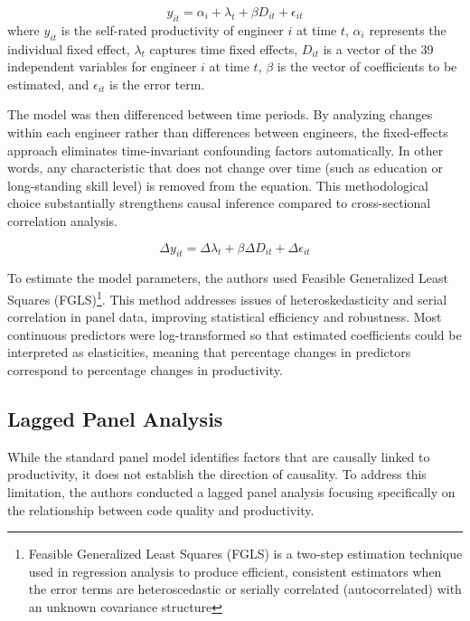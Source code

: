 \begin{equation}
    y_{it} = \alpha_{i} + \lambda_t + \beta D_{it} + \epsilon_{it}
\end{equation}
where $y_{it}$ is the self-rated productivity of engineer $i$ at time $t$, $\alpha_{i}$ represents the individual fixed effect, $\lambda_t$ captures time fixed effects, $D_{it}$ is a vector of the 39 independent variables for engineer $i$ at time $t$, $\beta$ is the vector of coefficients to be estimated, and $\epsilon_{it}$ is the error term.

The model was then differenced between time periods. By analyzing changes within each engineer rather than differences between engineers, the fixed-effects approach eliminates time-invariant confounding factors automatically. In other words, any characteristic that does not change over time (such as education or long-standing skill level) is removed from the equation. This methodological choice substantially strengthens causal inference compared to cross-sectional correlation analysis.

\begin{equation}
    \Delta y_{it} = \Delta \lambda_t + \beta\Delta  D_{it} + \Delta \epsilon_{it}
\end{equation}

To estimate the model parameters, the authors used Feasible Generalized Least Squares (FGLS)\footnote{Feasible Generalized Least Squares (FGLS) is a two-step estimation technique used in regression analysis to produce efficient, consistent estimators when the error terms are heteroscedastic or serially correlated (autocorrelated) with an unknown covariance structure}. This method addresses issues of heteroskedasticity and serial correlation in panel data, improving statistical efficiency and robustness. Most continuous predictors were log-transformed so that estimated coefficients could be interpreted as elasticities, meaning that percentage changes in predictors correspond to percentage changes in productivity.

\subsection{Lagged Panel Analysis}
While the standard panel model identifies factors that are causally linked to productivity, it does not establish the direction of causality. To address this limitation, the authors conducted a lagged panel analysis focusing specifically on the relationship between code quality and productivity.

